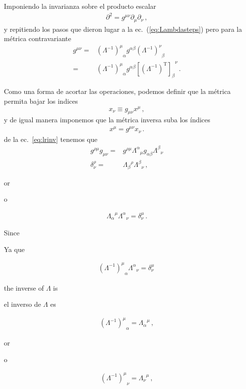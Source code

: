 \begin{frame}
Imponiendo la invarianza sobre el producto escalar
\begin{align}
  \partial^2=g^{\mu\nu}\partial_{\mu} \partial_{\nu}\,,
\end{align}
y repitiendo los pasos que dieron lugar a la ec.~(\ref{eq:Lambdasteps})
pero para la métrica contravariante
\begin{align}
g^{\mu\nu}=& {\left(\Lambda^{-1}\right)^\mu}_\alpha g^{\alpha \beta}{\left(\Lambda^{-1}\right)^\nu}_\beta \nonumber\\
=& {\left(\Lambda^{-1}\right)^\mu}_\alpha g^{\alpha \beta}{\left[ \left(\Lambda^{-1}\right)^{\operatorname{T}} \right]_{\beta}}^{\nu} \,.
\end{align}

Como una forma de acortar las operaciones, podemos definir que la métrica permita bajar los indices
\begin{equation}
\label{eq:149}
  x_\nu\equiv g_{\mu\nu}x^\mu\,,
\end{equation}
y de igual manera imponemos que la  métrica inversa suba  los índices
\begin{align}
  x^{\mu}=g^{\mu\nu}x_{\nu}\,.
\end{align}
de la ec.~\eqref{eq:lrinv} tenemos que
\begin{align}
  g^{\rho\mu}g_{\mu\nu}=&g^{\rho\mu}{\Lambda^\alpha}_{\mu}g_{\alpha\beta}{\Lambda^\beta}_{\nu}\nonumber\\
  \delta^\rho_\nu=&{\Lambda_\beta}^\rho{\Lambda^\beta}_{\nu}\,,
\end{align}
\begin{english}
or  
\end{english}
\begin{spanish}
o
\end{spanish}
\begin{align}
  {\Lambda_\alpha}^\mu{\Lambda^\alpha}_{\nu}=\delta^\mu_\nu\,.
\end{align}
\begin{english}
Since
\end{english}
\begin{spanish}
Ya que
\end{spanish}
\begin{align}
  {\left(\Lambda^{-1}\right)^\mu}_\alpha{\Lambda^\alpha}_{\nu}=\delta^\mu_\nu\,
\end{align}
\begin{english}
the inverse of $\Lambda$ is
\end{english}
\begin{spanish}
el inverso de $\Lambda$ es
\end{spanish}
\begin{align}
  {\left(\Lambda^{-1}\right)^\mu}_\alpha={\Lambda_\alpha}^\mu\,,
\end{align}
\begin{english}
or  
\end{english}
\begin{spanish}
o
\end{spanish}
\begin{align}
\label{eq:lambdainv}
  {\left(\Lambda^{-1}\right)^\mu}_\nu={\Lambda_\nu}^\mu\,,
\end{align}


\end{frame}

